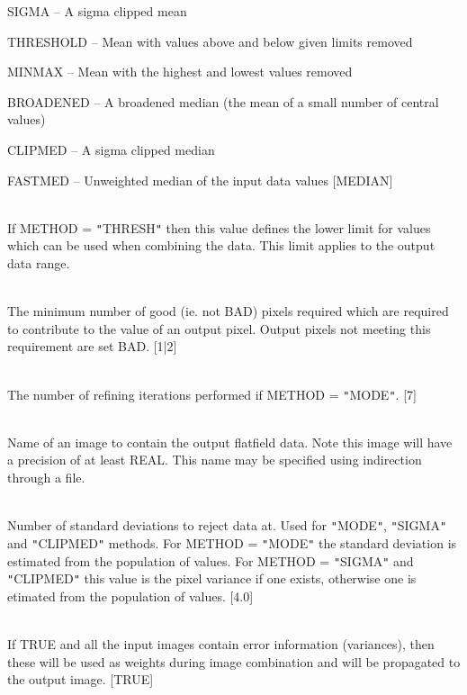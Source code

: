 \documentclass[twoside,11pt]{article}
\renewcommand{\_}{\texttt{\symbol{95}}}
\newcommand{\qt}[1]{{\tt "}#1{\tt "}}
\newcommand{\sstsubsection}[1]{ \item[{#1}] \mbox{} \\}
\newcommand{\sstitem}{\item}
\newcommand{\sstsubsection}[1]{\item[{#1}]}
\newcommand{\sstitem}{\item}
\begin{document}
{{{{            \sstitem
               SIGMA     -- A sigma clipped mean

            \sstitem
               THRESHOLD -- Mean with values above and below given
                               limits removed

            \sstitem
               MINMAX    -- Mean with the highest and lowest values
                               removed

            \sstitem
               BROADENED -- A broadened median (the mean of a small
                               number of central values)
            \sstitem
               CLIPMED   -- A sigma clipped median

            \sstitem
               FASTMED   -- Unweighted median of the input data values
            [MEDIAN]
         }
      }
      \sstsubsection{
         MIN = \_REAL (Read)
      } {
         If METHOD = \qt{THRESH} then this value defines the lower limit
         for values which can be used when combining the data. This
         limit applies to the output data range.
      }
      \sstsubsection{
         MINPIX = \_INTEGER (Read)
      } {
         The minimum number of good (ie. not BAD) pixels required which
         are required to contribute to the value of an output pixel.
         Output pixels not meeting this requirement are set BAD.
         [1|2]
      }
      \sstsubsection{
         NITER = \_INTEGER (Read)
      } {
         The number of refining iterations performed if METHOD = \qt{MODE}.
         [7]
      }
      \sstsubsection{
         OUT = LITERAL (Write)
      } {
         Name of an image to contain the output flatfield data. Note this
         image will have a precision of at least \_REAL. This name may be
         specified using indirection through a file.
      }
      \sstsubsection{
         SIGMAS = \_REAL (Read)
      } {
         Number of standard deviations to reject data at. Used for
         \qt{MODE}, \qt{SIGMA} and \qt{CLIPMED} methods. For METHOD =
         \qt{MODE} the standard deviation is estimated from the
         population of values. For METHOD = \qt{SIGMA} and
         \qt{CLIPMED} this value is the pixel variance if one exists,
         otherwise one is etimated from the population of values.
         [4.0]
      }
      \sstsubsection{
         USEVAR = \_LOGICAL (Read)
      } {
         If TRUE and all the input images contain error information
         (variances), then these will be used as weights during image
         combination and will be propagated to the output image.
         [TRUE]
}}}
\end{document}
